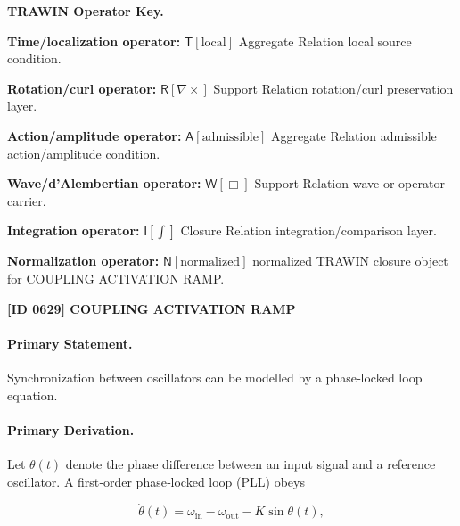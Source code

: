 \par\vspace{0.45\baselineskip}
\noindent\begin{minipage}[t]{\linewidth}
\begingroup
\small
\raggedright
\textbf{TRAWIN Operator Key.}\par
\noindent\textbf{Time/localization operator:} $\mathsf{T}\!\left[\mathrm{local}\right]$ Aggregate Relation local source condition.\par
\noindent\textbf{Rotation/curl operator:} $\mathsf{R}\!\left[\nabla\times\right]$ Support Relation rotation/curl preservation layer.\par
\noindent\textbf{Action/amplitude operator:} $\mathsf{A}\!\left[\mathrm{admissible}\right]$ Aggregate Relation admissible action/amplitude condition.\par
\noindent\textbf{Wave/d'Alembertian operator:} $\mathsf{W}\!\left[\Box\right]$ Support Relation wave or operator carrier.\par
\noindent\textbf{Integration operator:} $\mathsf{I}\!\left[\int\right]$ Closure Relation integration/comparison layer.\par
\noindent\textbf{Normalization operator:} $\mathsf{N}\!\left[\mathrm{normalized}\right]$ normalized TRAWIN closure object for COUPLING ACTIVATION RAMP.\par
\endgroup
\end{minipage}

\clearpage
\noindent\textbf{[ID 0629] COUPLING ACTIVATION RAMP}\par
\vspace{0.35em}
\paragraph{Primary Statement.}

Synchronization between oscillators can be modelled by a phase‑locked loop equation.

\paragraph{Primary Derivation.}

Let $\theta(t)$ denote the phase difference between an input signal and a reference oscillator.  A first‑order phase‑locked loop (PLL) obeys

\begin{equation}
\dot{\theta}(t) = \omega_{\mathrm{in}} - \omega_{\mathrm{out}} - K\sin\theta(t),
\end{equation}

